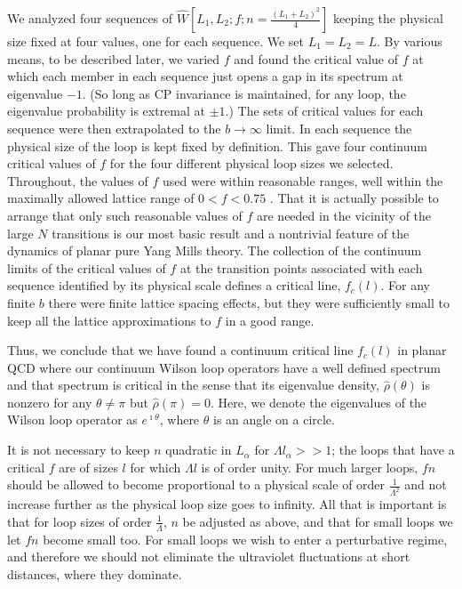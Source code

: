 We analyzed four sequences of $\hat W [L_1 , L_2; f;
n=\frac{(L_1 + L_2 )^2}{4}]$ keeping the physical size fixed at
four values, one for each sequence. We set $L_1=L_2=L$.
By various means, to be described later, we varied $f$ and found the
critical value of $f$ at which each member in each sequence
just opens a gap in its spectrum at eigenvalue $-1$.
(So long as CP invariance is maintained, for any loop,
the eigenvalue probability is
extremal at $\pm 1$.) The sets of critical values for
each sequence were then extrapolated
to the $b\to\infty$ limit. In each sequence
the physical size of the loop is kept fixed by definition. This gave four
continuum critical values of $f$ for the four different
physical loop sizes we selected. Throughout, the values of $f$ used were within
reasonable ranges, well within the maximally allowed lattice range
of $0<f<0.75$ \cite{pertsmear11}.
That it is actually possible to arrange that only such reasonable values of $f$
are needed in the vicinity of the large $N$ transitions
is our most basic result and a nontrivial feature of the dynamics
of planar pure Yang Mills theory. The collection of the continuum
limits of the critical values of $f$ at the
transition points associated with each sequence identified by its
physical scale defines a critical line, $f_c(l)$.
For any finite $b$ there were finite lattice spacing effects, but they
were sufficiently small to keep all the lattice approximations to
$f$ in a good range.

Thus, we conclude that we have found a continuum critical line
$f_c(l)$ in planar QCD where our continuum Wilson loop operators
have a well defined spectrum and that spectrum is critical in the
sense that its eigenvalue density, $\hat \rho (\theta)$ is nonzero
for any $\theta\ne\pi$ but $\hat\rho (\pi)=0$. Here, we denote the
eigenvalues of the Wilson loop operator as $e^{\imath\theta}$,
where $\theta$ is an angle on a circle.

It is not necessary to keep $n$ quadratic in $L_\alpha$ for
$\Lambda l_\alpha >>1$; the loops that have a critical $f$ are of
sizes $l$ for which $\Lambda l $ is of order unity. For much
larger loops, $f n$ should be allowed to become proportional to a
physical scale of order $\frac{1}{\Lambda^2}$ and not increase
further as the physical loop size goes to infinity. All that is
important is that for loop sizes of order $\frac{1}{\Lambda}$, $n$
be adjusted as above, and that for small loops we let $f n$ become
small too. For small loops we wish to enter a perturbative regime,
and therefore we should not eliminate the ultraviolet fluctuations
at short distances, where they dominate.

